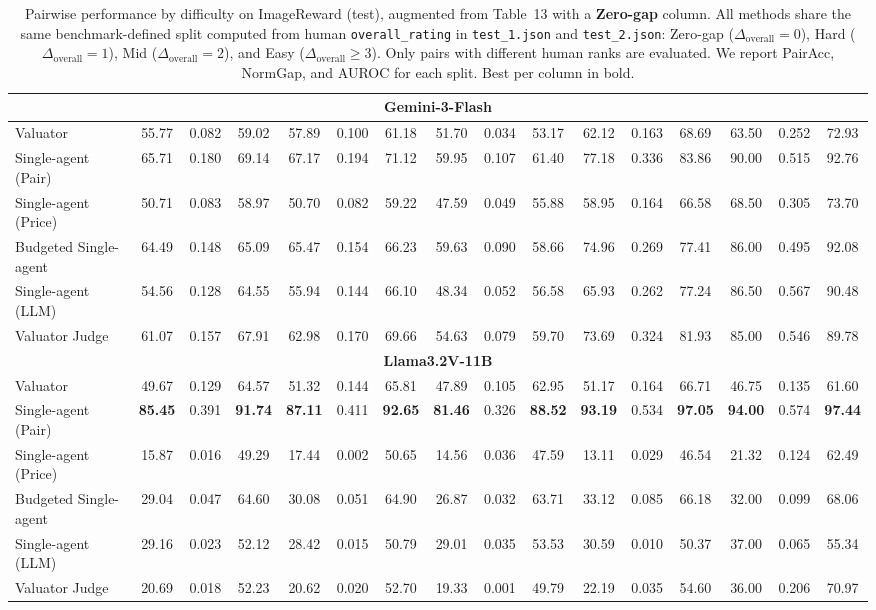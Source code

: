 \begin{table}[!t]
{\begin{tabular}{lccccccccccccccc}
\midrule
\multicolumn{16}{c}{\textbf{Gemini-3-Flash}} \\
\midrule
Valuator                     & 55.77 & 0.082 & 59.02 & 57.89 & 0.100 & 61.18 & 51.70 & 0.034 & 53.17 & 62.12 & 0.163 & 68.69 & 63.50 & 0.252 & 72.93 \\
Single-agent (Pair)          & 65.71 & 0.180 & 69.14 & 67.17 & 0.194 & 71.12 & 59.95 & 0.107 & 61.40 & 77.18 & 0.336 & 83.86 & 90.00 & 0.515 & 92.76 \\
Single-agent (Price)         & 50.71 & 0.083 & 58.97 & 50.70 & 0.082 & 59.22 & 47.59 & 0.049 & 55.88 & 58.95 & 0.164 & 66.58 & 68.50 & 0.305 & 73.70 \\
Budgeted Single-agent        & 64.49 & 0.148 & 65.09 & 65.47 & 0.154 & 66.23 & 59.63 & 0.090 & 58.66 & 74.96 & 0.269 & 77.41 & 86.00 & 0.495 & 92.08 \\
Single-agent (LLM)           & 54.56 & 0.128 & 64.55 & 55.94 & 0.144 & 66.10 & 48.34 & 0.052 & 56.58 & 65.93 & 0.262 & 77.24 & 86.50 & 0.567 & 90.48 \\
Valuator Judge               & 61.07 & 0.157 & 67.91 & 62.98 & 0.170 & 69.66 & 54.63 & 0.079 & 59.70 & 73.69 & 0.324 & 81.93 & 85.00 & 0.546 & 89.78 \\
\midrule
\multicolumn{16}{c}{\textbf{Llama3.2V-11B}} \\
\midrule
Valuator                     & 49.67 & 0.129 & 64.57 & 51.32 & 0.144 & 65.81 & 47.89 & 0.105 & 62.95 & 51.17 & 0.164 & 66.71 & 46.75 & 0.135 & 61.60 \\
Single-agent (Pair)          & \textbf{85.45} & 0.391 & \textbf{91.74} & \textbf{87.11} & 0.411 & \textbf{92.65} & \textbf{81.46} & 0.326 & \textbf{88.52} & \textbf{93.19} & 0.534 & \textbf{97.05} & \textbf{94.00} & 0.574 & \textbf{97.44} \\
Single-agent (Price)         & 15.87 & 0.016 & 49.29 & 17.44 & 0.002 & 50.65 & 14.56 & 0.036 & 47.59 & 13.11 & 0.029 & 46.54 & 21.32 & 0.124 & 62.49 \\
Budgeted Single-agent        & 29.04 & 0.047 & 64.60 & 30.08 & 0.051 & 64.90 & 26.87 & 0.032 & 63.71 & 33.12 & 0.085 & 66.18 & 32.00 & 0.099 & 68.06 \\
Single-agent (LLM)           & 29.16 & 0.023 & 52.12 & 28.42 & 0.015 & 50.79 & 29.01 & 0.035 & 53.53 & 30.59 & 0.010 & 50.37 & 37.00 & 0.065 & 55.34 \\
Valuator Judge               & 20.69 & 0.018 & 52.23 & 20.62 & 0.020 & 52.70 & 19.33 & 0.001 & 49.79 & 22.19 & 0.035 & 54.60 & 36.00 & 0.206 & 70.97 \\
\bottomrule
\end{tabular}
}
\caption{Pairwise performance by difficulty on ImageReward (test), augmented from Table~13 with a \textbf{Zero-gap} column. All methods share the same benchmark-defined split computed from human \texttt{overall\_rating} in \texttt{test\_1.json} and \texttt{test\_2.json}: Zero-gap ($\Delta_{\mathrm{overall}}=0$), Hard ($\Delta_{\mathrm{overall}}=1$), Mid ($\Delta_{\mathrm{overall}}=2$), and Easy ($\Delta_{\mathrm{overall}}\geq3$). Only pairs with different human ranks are evaluated. We report PairAcc, NormGap, and AUROC for each split. Best per column in bold.}
\label{tab:table17}
\end{table}